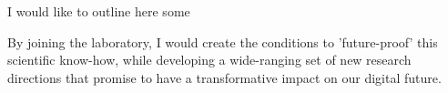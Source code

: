 I would like to outline here some

By joining the laboratory, I would create the conditions to
'future-proof' this scientific know-how, while developing a wide-ranging set of
new research directions that promise to have a transformative impact on our
digital future.

%
%
%
%
%
%
%
%
%
%
%
%
%
%
